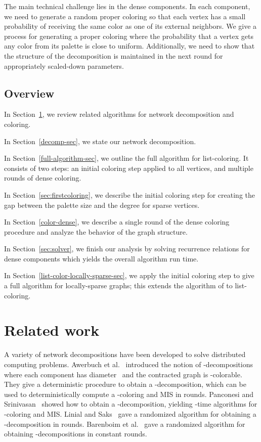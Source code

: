 \documentclass[11pt]{amsart}
\begin{document}
The main technical challenge lies in the dense components. In each component, we need to generate a random proper coloring so that each vertex has a small probability of receiving the same color as one of its external neighbors.
We give a process for generating a proper coloring where the probability that a vertex gets any color from its palette is close to uniform. Additionally, we need to show that the structure of the decomposition is maintained in the next round for appropriately scaled-down parameters.


\subsection{Overview}
In Section~\ref{related-work}, we review related algorithms for network decomposition and coloring.

In Section~\ref{decomp-sec}, we state our network decomposition.

In Section~\ref{full-algorithm-sec}, we outline the full algorithm for list-coloring. It consists of two steps: an initial coloring step applied to all vertices, and multiple rounds of dense coloring.

In Section~\ref{sec:firstcoloring}, we describe the initial coloring step for creating the gap between the palette size and the degree for sparse vertices.

In Section~\ref{color-dense}, we describe a single round of the dense coloring procedure and analyze the behavior of the graph structure. 

In Section~\ref{sec:solver}, we finish our analysis by solving recurrence relations for dense components which yields the overall algorithm run time. 

In Section~\ref{list-color-locally-sparse-sec}, we apply the initial coloring step to give a full algorithm for locally-sparse graphs; this extends the algorithm of \cite{elk15} to list-coloring.

\section{Related work}\label{related-work}
A variety of network decompositions have been developed to solve distributed computing problems. Awerbuch et al.~\cite{awer89} introduced the notion of -decompositions where each component has diameter~ and the contracted graph is -colorable. They give a deterministic procedure to obtain a -decomposition, which can be used to deterministically compute a -coloring and MIS in  rounds. Panconesi and Srinivasan~\cite{panc92} showed how to obtain a -decomposition, yielding -time algorithms for -coloring and MIS. Linial and Saks~\cite{lin93} gave a randomized algorithm for obtaining a -decomposition in  rounds. Barenboim et al.~\cite{bar15} gave a randomized algorithm for obtaining -decompositions in constant rounds.
\end{document}
